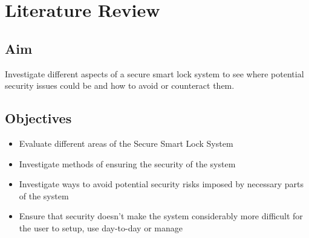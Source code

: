 \chapter{Literature Review}
\label{chap:literature_review}

\section{Aim}
Investigate different aspects of a secure smart lock system to see where potential security issues could be and how to avoid or counteract them.
\section{Objectives}
\begin{itemize}
	\item {Evaluate different areas of the Secure Smart Lock System}
	\item Investigate methods of ensuring the security of the system
	\item Investigate ways to avoid potential security risks imposed by necessary parts of the system
	\item Ensure that security doesn't make the system considerably more difficult for the user to setup, use day-to-day or manage
\end{itemize}

